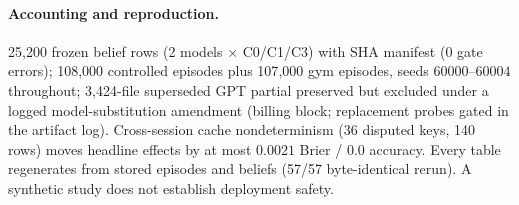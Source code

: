 \documentclass[runningheads]{llncs}
\begin{document}
\paragraph{Accounting and reproduction.}
25{,}200 frozen belief rows (2 models $\times$ C0/C1/C3) with SHA manifest
(0 gate errors); 108{,}000 controlled episodes plus 107{,}000 gym episodes,
seeds $60000$--$60004$ throughout; 3{,}424-file superseded GPT partial
preserved but excluded under a logged model-substitution amendment (billing
block; replacement probes gated in the artifact log). Cross-session cache nondeterminism
(36 disputed keys, 140 rows) moves headline effects by at most $0.0021$
Brier / $0.0$ accuracy. Every table regenerates from stored episodes and
beliefs (57/57 byte-identical rerun). A synthetic study does not establish
deployment safety.

\label{endofcontent}



\end{document}
